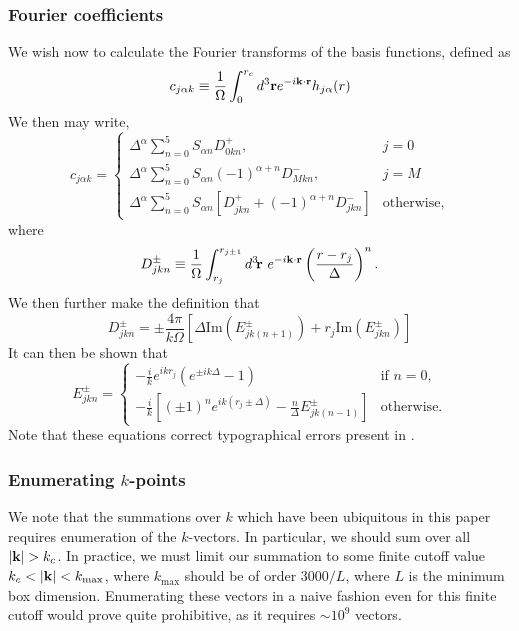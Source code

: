 \subsubsection*{Fourier coefficients}
We wish now to calculate the Fourier transforms of the basis
functions, defined as
\begin{equation}
c_{j\alpha k} \equiv \frac{1}{\Omega} \int_0^{r_c} d^3 \vr 
e^{-i \vk \cdot \vr} h_{j\alpha}(r)
\end{equation}
We then may write,
\begin{equation}
c_{j\alpha k} = 
\begin{cases}
\Delta^\alpha \sum_{n=0}^5 S_{\alpha n} D^+_{0 k n}, & j = 0 \\
\Delta^\alpha \sum_{n=0}^5 S_{\alpha n} (-1)^{\alpha+n} D^-_{M k n}, &
j = M \\
\Delta^\alpha \sum_{n=0}^5 S_{\alpha n} 
\left[ D^+_{j k n} + (-1)^{\alpha+n}D^-_{j k n} \right] & \text{otherwise},
\end{cases}
\end{equation}
where
\begin{equation}
D^{\pm}_{jkn} \equiv \frac{1}{\Omega} \int_{r_j}^{r_{j\pm1}} d^3\!\vr \ 
e^{-i\vk \cdot \vr} \left( \frac{r-r_j}{\Delta}\right)^n.
\end{equation}
We then further make the definition that
\renewcommand{\Im}{\text{Im}}
\begin{equation}
D^{\pm}_{jkn} = \pm \frac{4\pi}{k \Omega} 
\left[ \Delta \Im \left(E^{\pm}_{jk(n+1)}\right) + 
r_j \Im \left(E^{\pm}_{jkn}\right)\right]
\end{equation}
It can then be shown that 
\begin{equation}
E^{\pm}_{jkn} =
\begin{cases}
-\frac{i}{k} e^{ikr_j} \left( e^{\pm i k \Delta} - 1 \right) &
\text{if } n=0, \\
-\frac{i}{k} 
\left[ \left(\pm1\right)^n e^{i k (r_j \pm \Delta)} - \frac{n}{\Delta}
E^\pm_{jk(n-1)}  \right] & \text{otherwise}.
\end{cases}
\end{equation}
Note that these equations correct typographical errors present in \cite{Natoli1995}.
\subsubsection{Enumerating $k$-points}
We note that the summations over $k$ which have been ubiquitous in
this paper requires enumeration of the $k$-vectors.  In particular, we
should sum over all $|\vk| > k_c$.  In practice, we must limit our
summation to some finite cutoff value $k_c < |\vk| < k_{\text{max}}$,
where $k_{\text{max}}$ should be of order $3000/L$, where $L$ is the
minimum box dimension.  Enumerating these vectors in a naive fashion
even for this finite cutoff would prove quite prohibitive, as it
requires $\sim 10^9$ vectors.


